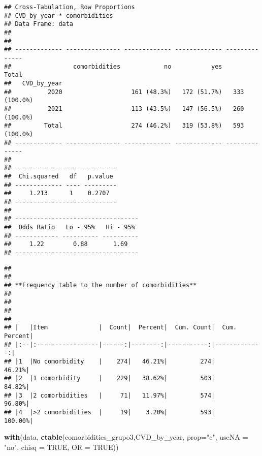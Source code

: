 \documentclass[
]{article}
\newenvironment{Shaded}{\begin{snugshade}}{\end{snugshade}}
\newcommand{\AttributeTok}[1]{\textcolor[rgb]{0.13,0.29,0.53}{#1}}
\newcommand{\ConstantTok}[1]{\textcolor[rgb]{0.56,0.35,0.01}{#1}}
\newcommand{\FunctionTok}[1]{\textcolor[rgb]{0.13,0.29,0.53}{\textbf{#1}}}
\newcommand{\NormalTok}[1]{#1}
\newcommand{\SpecialCharTok}[1]{\textcolor[rgb]{0.81,0.36,0.00}{\textbf{#1}}}
\newcommand{\StringTok}[1]{\textcolor[rgb]{0.31,0.60,0.02}{#1}}
\begin{document}
\begin{verbatim}
## Cross-Tabulation, Row Proportions  
## CVD_by_year * comorbidities  
## Data Frame: data  
## 
## 
## ------------- --------------- ------------- ------------- --------------
##                 comorbidities            no           yes          Total
##   CVD_by_year                                                           
##          2020                   161 (48.3%)   172 (51.7%)   333 (100.0%)
##          2021                   113 (43.5%)   147 (56.5%)   260 (100.0%)
##         Total                   274 (46.2%)   319 (53.8%)   593 (100.0%)
## ------------- --------------- ------------- ------------- --------------
## 
## ----------------------------
##  Chi.squared   df   p.value 
## ------------- ---- ---------
##     1.213      1    0.2707  
## ----------------------------
## 
## ----------------------------------
##  Odds Ratio   Lo - 95%   Hi - 95% 
## ------------ ---------- ----------
##     1.22        0.88       1.69   
## ----------------------------------
\end{verbatim}

\begin{Shaded}
\end{Shaded}

\begin{verbatim}
## 
## 
## **Frequency table to the number of comorbidities**   
## 
## 
## 
## 
## |   |Item              |  Count|  Percent|  Cum. Count|  Cum. Percent|
## |:--|:-----------------|------:|--------:|-----------:|-------------:|
## |1  |No comorbidity    |    274|   46.21%|         274|        46.21%|
## |2  |1 comorbidity     |    229|   38.62%|         503|        84.82%|
## |3  |2 comorbidities   |     71|   11.97%|         574|        96.80%|
## |4  |>2 comorbidities  |     19|    3.20%|         593|       100.00%|
\end{verbatim}

\begin{Shaded}
\begin{Highlighting}[]
\FunctionTok{with}\NormalTok{(data, }\FunctionTok{ctable}\NormalTok{(comorbidities\_grupo3,CVD\_by\_year, }\AttributeTok{prop=}\StringTok{"c"}\NormalTok{, }\AttributeTok{useNA =} \StringTok{"no"}\NormalTok{, }\AttributeTok{chisq =} \ConstantTok{TRUE}\NormalTok{, }\AttributeTok{OR =} \ConstantTok{TRUE}\NormalTok{))}
\end{Highlighting}
\end{Shaded}
\end{document}
